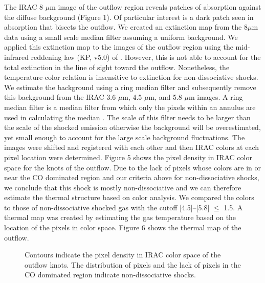 \documentclass[iop]{emulateapj}
\begin{document}
The IRAC 8 $\mu$m image of the outflow region reveals patches of absorption
against the diffuse background (Figure 1). Of particular interest is a dark patch seen 
in absorption that bisects the outflow. We created an extinction map from 
the 8$\mu$m data
using a small scale median filter assuming a uniform background.
We applied this extinction map to the images of
the outflow region using the mid-infrared reddening law (KP, v5.0)
of \citet{cha2009}. However, this is not able to 
account for the total extinction in the line of sight toward the outflow. 
Nonetheless, the temperature-color relation is insensitive to extinction 
for non-dissociative shocks.
We estimate the background using a ring median filter 
and subsequently remove this background from the IRAC 
3.6 $\mu$m, 4.5 $\mu$m, and 5.8 $\mu$m
images.
A ring median filter is a median filter from which only the pixels
within an annulus are used in calculating the median \citep{sec1995}. 
The scale of this filter needs to be larger than the scale of the 
shocked emission otherwise the background will be overestimated, yet
small enough to account for the large scale background fluctuations.
The images were shifted and
registered with each other and then IRAC colors at each pixel location
were determined. Figure 5 shows the pixel density in IRAC color space
for the knots of the outflow. Due to the lack of pixels whose colors
are in or near the CO dominated region and our criteria above for
non-dissociative shocks, we conclude that this shock is mostly
non-dissociative and we can therefore estimate the thermal structure
based on color analysis. We compared the colors to those of non-dissociative 
shocked gas with
the cutoff [4.5]--[5.8] $\leq$ 1.5. A thermal map was 
created by estimating the gas temperature based on the
location of the pixels in color space. Figure 6 shows the 
thermal map  of the outflow.

\begin{figure}
%
\caption{Contours indicate the pixel density in IRAC color space of the 
outflow knots. The distribution of pixels and the lack of pixels in the CO 
dominated region indicate non-dissociative shocks.} 
\end{figure}
\end{document}
